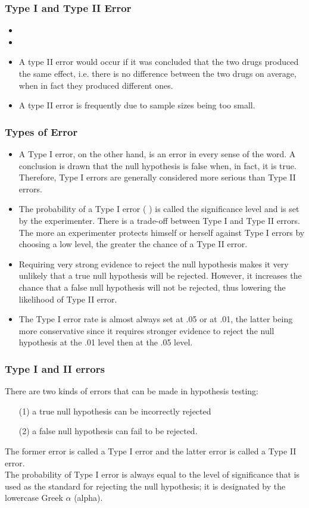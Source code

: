 \begin{frame}
\frametitle{Type I and Type II Error}
\begin{itemize}
\item
\item
\item A type II error would occur if it was concluded that the two drugs produced the same effect, i.e. there is no difference between the two drugs on average, when in fact they produced different ones.
\item A type II error is frequently due to sample sizes being too small.
\end{itemize}
\end{frame}
\begin{frame}
\frametitle{Types of Error}
\begin{itemize}
\item
A Type I error, on the other hand, is an error in every sense of the word. A conclusion is drawn that the null hypothesis is false when, in fact, it is true. Therefore, Type I errors are generally considered more serious than Type II errors.
 \item
The probability of a Type I error ( ) is called the significance level and is set by the experimenter. There is a trade-off between Type I and Type II errors. The more an experimenter protects himself or herself against Type I errors by choosing a low level, the greater the chance of a Type II error.
\item
Requiring very strong evidence to reject the null hypothesis makes it very unlikely that a true null hypothesis will be rejected. However, it increases the chance that a false null hypothesis will not be rejected, thus lowering the likelihood of Type II error.
\item
The Type I error rate is almost always set at .05 or at .01, the latter being more conservative since it requires stronger evidence to reject the null hypothesis at the .01 level then at the .05 level.
\end{itemize}
\end{frame}

\begin{frame}
\frametitle{Type I and II errors}
There are two kinds of errors that can be made in hypothesis testing:
\begin{itemize}
\item[(1)] a true null hypothesis can be incorrectly rejected
\item[(2)] a false null hypothesis can fail to be rejected.
\end{itemize}

The former error is called a Type I error and the latter error is called a Type II error. \\

The probability of Type I error is always equal to the level of significance that is used as the standard for rejecting
the null hypothesis; it is designated by the lowercase Greek $\alpha$ (alpha).

\end{frame}


